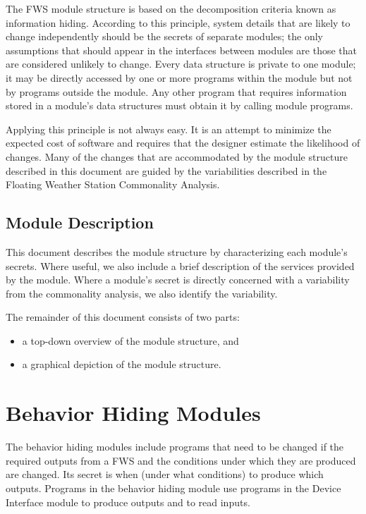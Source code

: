 \documentclass[letterpaper,11pt]{article}
\begin{document}
The FWS module structure is based on the decomposition criteria known as information hiding. According to this principle, system details that are likely to change independently should be the secrets of separate modules; the only assumptions that should appear in the interfaces between modules are those that are considered unlikely to change. Every data structure is private to one module; it may be directly accessed by one or more programs within the module but not by programs outside the module. Any other program that requires information stored in a module's data structures must obtain it by calling module programs.
 
Applying this principle is not always easy. It is an attempt to minimize the expected cost of software and requires that the designer estimate the likelihood of changes.  Many of the changes that are accommodated by the module structure described in this document are guided by the variabilities described in the Floating Weather Station Commonality Analysis.

\subsection{Module Description}
This document describes the module structure by characterizing each module's secrets. Where useful, we also include a brief description of the services provided by the module. Where a module's secret is directly concerned with a variability from the commonality analysis, we also identify the variability.
 
The remainder of this document consists of two parts:
\begin{itemize}
\item a top-down overview of the module structure, and
\item a graphical depiction of the module structure.
\end{itemize}

\setcounter{secnumdepth}{3}

\section{Behavior Hiding Modules}
The behavior hiding modules include programs that need to be changed if the required outputs from a FWS and the conditions under which they are produced are changed. Its secret is when (under what conditions) to produce which outputs.  Programs in the behavior hiding module use programs in the Device Interface module to produce outputs and to read inputs. 
\end{document}
